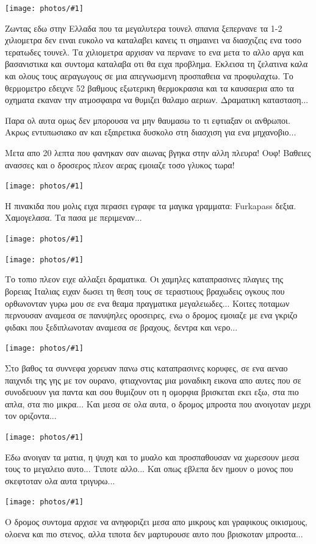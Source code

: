 \documentclass[11pt, letterpaper]{book}
\newcommand\photo[1]{\begin{center}\noindent\texttt{[image: photos/\#1]}\end{center}}
\begin{document}
\photo{38.jpg}

Ζωντας εδω στην Ελλαδα που τα μεγαλυτερα τουνελ σπανια ξεπερνανε τα 1-2 χιλιομετρα δεν ειναι ευκολο να καταλαβει κανεις τι σημαινει να διασχιζεις ενα τοσο τερατωδες τουνελ. 
Τα χιλιομετρα αρχισαν να περνανε το ενα μετα το αλλο αργα και βασανιστικα και συντομα καταλαβα οτι θα ειχα προβλημα. Εκλεισα τη ζελατινα καλα και ολους τους αεραγωγους σε μια απεγνωσμενη προσπαθεια να προφυλαχτω. Το θερμομετρο εδειχνε 52 βαθμους εξωτερικη θερμοκρασια και τα καυσαερια απο τα οχηματα εκαναν την ατμοσφαιρα να θυμιζει θαλαμο αεριων. Δραματικη κατασταση...

Παρα ολ αυτα ομως δεν μπορουσα να μην θαυμασω το τι εφτιαξαν οι ανθρωποι. Ακρως εντυπωσιακο αν και εξαιρετικα δυσκολο στη διασχιση για ενα μηχανοβιο...

Μετα απο 20 λεπτα που φανηκαν σαν αιωνας βγηκα στην αλλη πλευρα! Ουφ! Βαθειες ανασσες και ο δροσερος πλεον αερας εμοιαζε τοσο γλυκος τωρα!

\photo{39.jpg}

Η πινακιδα που μολις ειχα περασει εγραφε τα μαγικα γραμματα: Furkapass δεξια. 
Χαμογελασα. Τα πασα με περιμεναν...

\photo{40.jpg}
\photo{41.jpg}

Το τοπιο πλεον ειχε αλλαξει δραματικα. Οι χαμηλες καταπρασινες πλαγιες της βορειας Ιταλιας ειχαν δωσει τη θεση τους σε τεραστιους βραχωδεις ογκους που ορθωνονταν γυρω μου σε ενα θεαμα πραγματικα μεγαλειωδες...
Κοιτες ποταμων περνουσαν αναμεσα σε πανυψηλες οροσειρες, ενω ο δρομος εμοιαζε με ενα γκριζο φιδακι που ξεδιπλωνοταν αναμεσα σε βραχους, δεντρα και νερο...

\photo{42.jpg}

Στο βαθος τα συννεφα χορευαν πανω στις καταπρασινες κορυφες, σε ενα αεναο παιχνιδι της γης με τον ουρανο, φτιαχνοντας μια μοναδικη εικονα απο αυτες που σε συνοδευουν για παντα και σου θυμιζουν οτι η ομορφια βρισκεται εκει εξω, στα πιο απλα, στα πιο μικρα... 
Και μεσα σε ολα αυτα, ο δρομος μπροστα που ανοιγοταν μεχρι τον οριζοντα... 

\photo{43.jpg}

Εδω ανοιγαν τα ματια, η ψυχη και το μυαλο και προσπαθουσαν να χωρεσουν μεσα τους το μεγαλειο αυτο... Τιποτε αλλο...
Και οπως εβλεπα δεν ημουν ο μονος που σκεφτοταν ολα αυτα τριγυρω... 

\photo{44.jpg}

O δρομος συντομα αρχισε να ανηφοριζει μεσα απο μικρους και γραφικους οικισμους, ολοενα και πιο στενος, αλλα τιποτα δεν μαρτυρουσε αυτο που βρισκοταν μπροστα...
\end{document}
